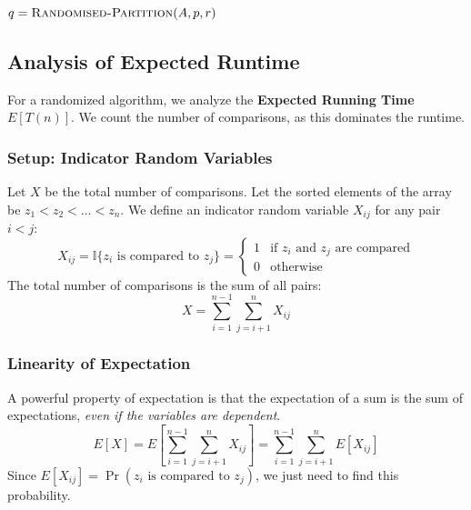 \documentclass[12pt]{article}
\theoremstyle{blueplain}
\theoremstyle{bluedef}
\theoremstyle{blueremark}
\begin{document}
\begin{algorithm}
    \caption{Randomised QuickSort}\label{alg:randQuickSort}
    \begin{algorithmic}[1]
        \State $q = \Call{Randomised-Partition}{A, p, r}$
        \State {}
        \State {}
        \EndIf
        \EndProcedure
    \end{algorithmic}
\end{algorithm}

\subsection{Analysis of Expected Runtime}

For a randomized algorithm, we analyze the \textbf{Expected Running Time} $E[T(n)]$. We count the number of comparisons, as this dominates the runtime.

\subsubsection{Setup: Indicator Random Variables}
Let $X$ be the total number of comparisons.
Let the sorted elements of the array be $z_1 < z_2 < \dots < z_n$.
We define an indicator random variable $X_{ij}$ for any pair $i < j$:
\[
    X_{ij} = \mathbb{I}\{ z_i \text{ is compared to } z_j \} = \begin{cases}
        1 & \text{if } z_i \text{ and } z_j \text{ are compared} \\
        0 & \text{otherwise}
    \end{cases}
\]
The total number of comparisons is the sum of all pairs:
\[ X = \sum_{i=1}^{n-1} \sum_{j=i+1}^{n} X_{ij} \]

\subsubsection{Linearity of Expectation}
A powerful property of expectation is that the expectation of a sum is the sum of expectations, \textit{even if the variables are dependent}.
\[ E[X] = E\left[ \sum_{i=1}^{n-1} \sum_{j=i+1}^{n} X_{ij} \right] = \sum_{i=1}^{n-1} \sum_{j=i+1}^{n} E[X_{ij}] \]
Since $E[X_{ij}] = \Pr(z_i \text{ is compared to } z_j)$, we just need to find this probability.
\end{document}
